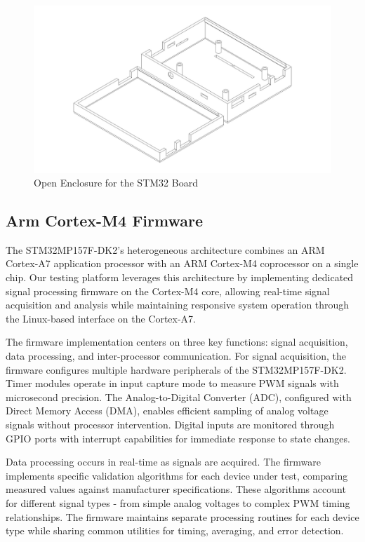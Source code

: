 \documentclass[12pt]{article}
\begin{document}
\begin{figure}[H]
  \includegraphics[width=\textwidth]{../assets/pcb/image13.jpg}
  \caption{Open Enclosure for the STM32 Board}
\end{figure}

\subsection{Arm Cortex-M4 Firmware}

The STM32MP157F-DK2's heterogeneous architecture combines an ARM Cortex-A7 application processor with an ARM Cortex-M4 coprocessor on a single chip. Our testing platform leverages this architecture by implementing dedicated signal processing firmware on the Cortex-M4 core, allowing real-time signal acquisition and analysis while maintaining responsive system operation through the Linux-based interface on the Cortex-A7.

The firmware implementation centers on three key functions: signal acquisition, data processing, and inter-processor communication. For signal acquisition, the firmware configures multiple hardware peripherals of the STM32MP157F-DK2. Timer modules operate in input capture mode to measure PWM signals with microsecond precision. The Analog-to-Digital Converter (ADC), configured with Direct Memory Access (DMA), enables efficient sampling of analog voltage signals without processor intervention. Digital inputs are monitored through GPIO ports with interrupt capabilities for immediate response to state changes.

Data processing occurs in real-time as signals are acquired. The firmware implements specific validation algorithms for each device under test, comparing measured values against manufacturer specifications. These algorithms account for different signal types - from simple analog voltages to complex PWM timing relationships. The firmware maintains separate processing routines for each device type while sharing common utilities for timing, averaging, and error detection.
\end{document}
